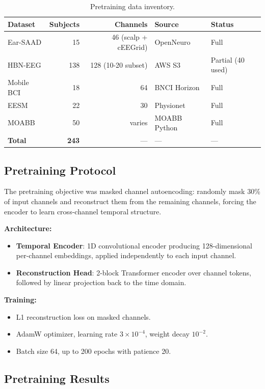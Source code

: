 \documentclass[11pt,a4paper]{article}
\begin{document}
\begin{table}[H]
\centering
\caption{Pretraining data inventory.}
\begin{tabular}{lrrll}
\toprule
Dataset & Subjects & Channels & Source & Status \\
\midrule
Ear-SAAD & 15 & 46 (scalp + cEEGrid) & OpenNeuro & Full \\
HBN-EEG & 138 & 128 (10-20 subset) & AWS S3 & Partial (40 used) \\
Mobile BCI & 18 & 64 & BNCI Horizon & Full \\
EESM & 22 & 30 & Physionet & Full \\
MOABB & 50 & varies & MOABB Python & Full \\
\midrule
\textbf{Total} & \textbf{243} & --- & --- & --- \\
\bottomrule
\end{tabular}
\end{table}

\subsection{Pretraining Protocol}

The pretraining objective was masked channel autoencoding: randomly mask
30\% of input channels and reconstruct them from the remaining channels,
forcing the encoder to learn cross-channel temporal structure.

\textbf{Architecture:}
\begin{itemize}
  \item \textbf{Temporal Encoder}: 1D convolutional encoder producing
    128-dimensional per-channel embeddings, applied independently to each
    input channel.
  \item \textbf{Reconstruction Head}: 2-block Transformer encoder over
    channel tokens, followed by linear projection back to the time domain.
\end{itemize}

\textbf{Training:}
\begin{itemize}
  \item L1 reconstruction loss on masked channels.
  \item AdamW optimizer, learning rate $3 \times 10^{-4}$, weight decay $10^{-2}$.
  \item Batch size 64, up to 200 epochs with patience 20.
\end{itemize}

\subsection{Pretraining Results}
\end{document}
